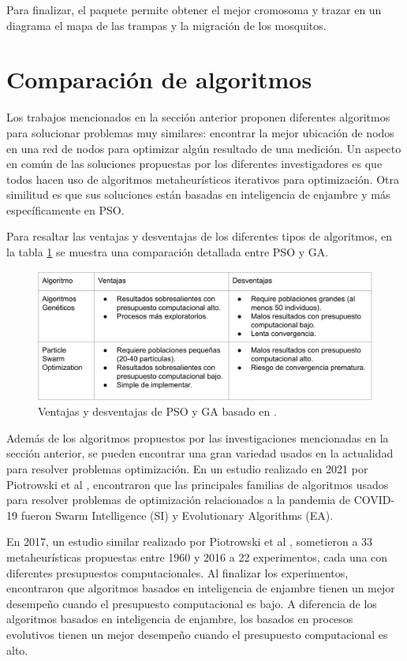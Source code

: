   Para finalizar, el paquete permite obtener el mejor cromosoma y trazar en un
  diagrama el mapa de las trampas y la migración de los mosquitos.

\section{Comparación de algoritmos}
\label{section:analisis}
Los trabajos mencionados en la sección anterior proponen diferentes algoritmos
para solucionar problemas muy similares: encontrar la mejor ubicación de nodos
en una red de nodos para optimizar algún resultado de una medición. Un aspecto
en común de las soluciones propuestas por los diferentes investigadores es que
todos hacen uso de algoritmos metaheurísticos iterativos para optimización.
Otra similitud es que sus soluciones están basadas en inteligencia de enjambre
y más específicamente en PSO. 

Para resaltar las ventajas y desventajas de los diferentes tipos de
algoritmos, en la tabla \ref{table:pso-ga-pros-cons} se muestra una
comparación detallada entre PSO y GA.

\begin{figure}[ht!]
  \includegraphics[width=\textwidth]{pso-ga-pros-cons.png}
  \caption{Ventajas y desventajas de PSO y GA basado en
    \cite{DE&PSOCov, SwarmVsEvol}.}
  \label{table:pso-ga-pros-cons}
\end{figure}

Además de los algoritmos propuestos por las investigaciones mencionadas en la 
sección anterior, se pueden encontrar una gran variedad usados en la
actualidad para 
resolver problemas optimización. En un estudio realizado en 2021 por
Piotrowski et al \cite{DE&PSOCov}, encontraron que las principales familias de
algoritmos usados para resolver problemas de optimización relacionados a la 
pandemia de COVID-19 fueron Swarm Intelligence (SI) y Evolutionary Algorithms
(EA). 

En 2017, un estudio similar realizado por Piotrowski et al \cite{SwarmVsEvol},
sometieron a 33 metaheurísticas propuestas entre 1960 y 2016 a 22
experimentos, cada una con diferentes presupuestos computacionales.
Al finalizar los experimentos, encontraron que algoritmos basados en
inteligencia de enjambre tienen un mejor desempeño cuando el presupuesto
computacional es bajo. A diferencia de los algoritmos basados en inteligencia
de enjambre, los basados en procesos evolutivos tienen un mejor desempeño
cuando el presupuesto computacional es alto. 

